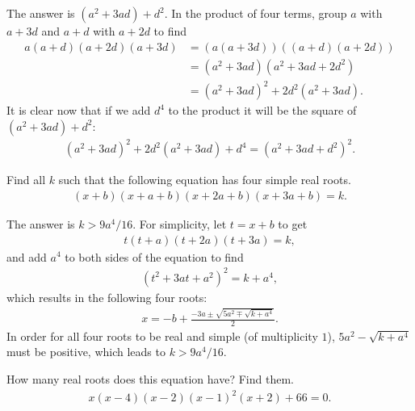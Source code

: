 \begin{solution}[name=Solution by Parviz Shahriari]
The answer is $\left(a^2 + 3ad\right)+d^2$. In the product of four terms, group $a$ with $a+3d$ and $a+d$ with $a+2d$ to find
\begin{align*}
    a(a+d)(a+2d)(a+3d) &= \left(a(a+3d)\right) \left((a+d)(a+2d)\right)\\
                       &= \left(a^2 + 3ad\right)\left(a^2+3ad+2d^2\right)\\
                       &= \left(a^2 + 3ad\right)^2 + 2d^2\left(a^2 + 3ad\right).
\end{align*}
It is clear now that if we add $d^4$ to the product it will be the square of $\left(a^2 + 3ad\right)+d^2$:
\begin{align*}
    \left(a^2 + 3ad\right)^2 + 2d^2\left(a^2 + 3ad\right) + d^4 = \left(a^2 + 3ad+d^2\right)^2.
\end{align*}
\end{solution}


\begin{tcolorbox}
\begin{question}
Find all $k$ such that the following equation has four simple real roots.
\begin{align*}
    (x+b)(x+a+b)(x+2a+b)(x+3a+b)=k.
\end{align*}
\end{question}
\end{tcolorbox}

\begin{solution}[name=Solution by Parviz Shahriari]
The answer is $k > 9a^4/16$. For simplicity, let $t=x+b$ to get
\begin{align*}
    t(t+a)(t+2a)(t+3a)=k,
\end{align*}
and add $a^4$ to both sides of the equation to find
\begin{align*}
    (t^2+3at+a^2)^2 = k+a^4,
\end{align*}
which results in the following four roots:
\begin{align*}
    x = -b + \frac{-3a \pm \sqrt{5a^2 \mp \sqrt{k+a^4}}}{2}.
\end{align*}
In order for all four roots to be real and simple (of multiplicity $1$), $5a^2 - \sqrt{k+a^4}$ must be positive, which leads to $k > 9a^4/16$.
\end{solution}



\begin{tcolorbox}
\begin{question}
How many real roots does this equation have? Find them.
\begin{align*}
    x(x-4)(x-2)(x-1)^2(x+2)+66=0.
\end{align*}
\end{question}
\end{tcolorbox}

